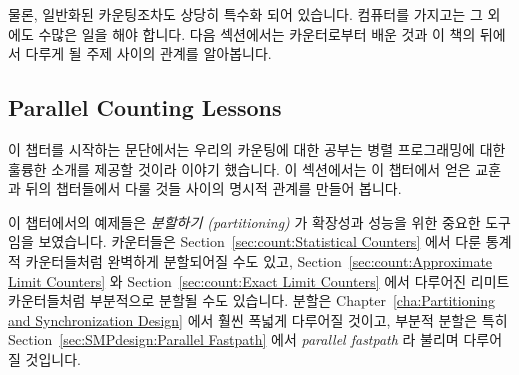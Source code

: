 물론, 일반화된 카운팅조차도 상당히 특수화 되어 있습니다.
컴퓨터를 가지고는 그 외에도 수많은 일을 해야 합니다.
다음 섹션에서는 카운터로부터 배운 것과 이 책의 뒤에서 다루게 될 주제 사이의
관계를 알아봅니다.

\subsection{Parallel Counting Lessons}
\label{sec:count:Parallel Counting Lessons}

이 챕터를 시작하는 문단에서는 우리의 카운팅에 대한 공부는 병렬 프로그래밍에
대한 훌륭한 소개를 제공할 것이라 이야기 했습니다.
이 섹션에서는 이 챕터에서 얻은 교훈과 뒤의 챕터들에서 다룰 것들 사이의 명시적
관계를 만들어 봅니다.

이 챕터에서의 예제들은 \emph{분할하기 (partitioning)} 가 확장성과 성능을 위한
중요한 도구임을 보였습니다.
카운터들은 Section~\ref{sec:count:Statistical Counters} 에서 다룬 통계적
카운터들처럼 완벽하게 분할되어질 수도 있고, Section~\ref{sec:count:Approximate
Limit Counters} 와 Section~\ref{sec:count:Exact Limit Counters} 에서 다루어진
리미트 카운터들처럼 부분적으로 분할될 수도 있습니다.
분할은 Chapter~\ref{cha:Partitioning and Synchronization Design} 에서 훨씬
폭넓게 다루어질 것이고, 부분적 분할은 특히 Section~\ref{sec:SMPdesign:Parallel
Fastpath} 에서 \emph{parallel fastpath} 라 불리며 다루어질 것입니다.

